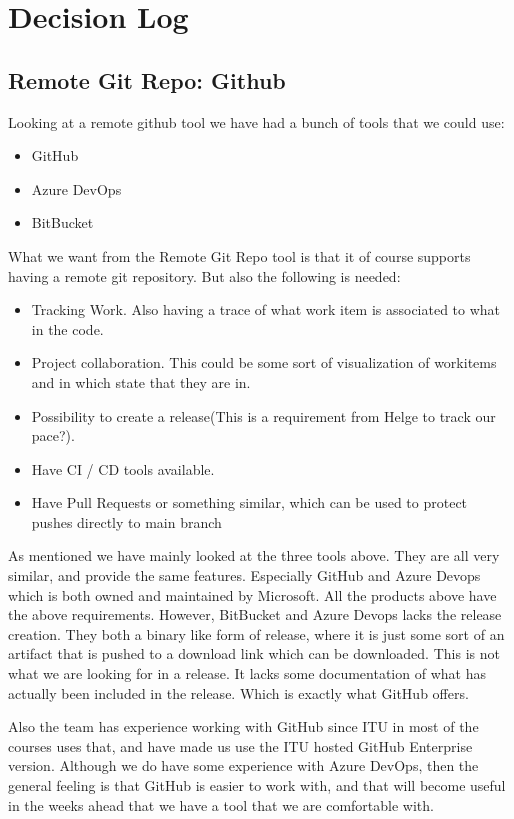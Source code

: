 \section{Decision Log}
\label{appendix:decision-log}

\subsection{Remote Git Repo: Github}
Looking at a remote github tool we have had a bunch of tools that we could use:
\begin{itemize}
    \item GitHub
    \item Azure DevOps
    \item BitBucket
\end{itemize}

What we want from the Remote Git Repo tool is that it of course supports having a remote git repository. But also the following is needed:
\begin{itemize}
    \item Tracking Work. Also having a trace of what work item is associated to what in the code.
    \item Project collaboration. This could be some sort of visualization of workitems and in which state that they are in.
    \item Possibility to create a release(This is a requirement from Helge to track our pace?).
    \item Have CI / CD tools available.
    \item Have Pull Requests or something similar, which can be used to protect pushes directly to main branch
\end{itemize}

As mentioned we have mainly looked at the three tools above. They are all very similar, and provide the same features. Especially GitHub and Azure Devops which is both owned and maintained by Microsoft. All the products above have the above requirements. However, BitBucket and Azure Devops lacks the release creation. They both a binary like form of release, where it is just some sort of an artifact that is pushed to a download link which can be downloaded. This is not what we are looking for in a release. It lacks some documentation of what has actually been included in the release. Which is exactly what GitHub offers.

Also the team has experience working with GitHub since ITU in most of the courses uses that, and have made us use the ITU hosted GitHub Enterprise version. Although we do have some experience with Azure DevOps, then the general feeling is that GitHub is easier to work with, and that will become useful in the weeks ahead that we have a tool that we are comfortable with.

